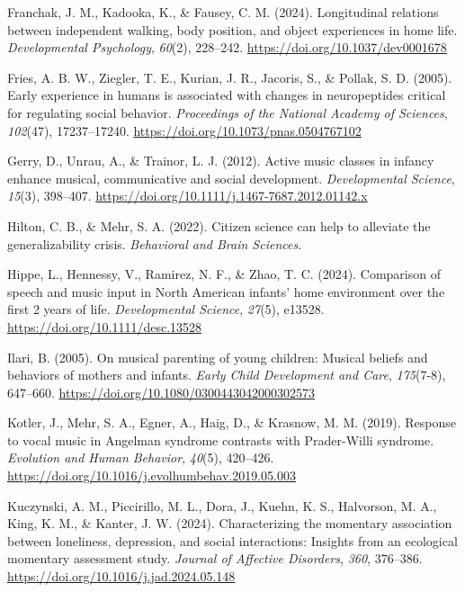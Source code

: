 \documentclass[
]{article}
\newlength{\cslhangindent}
\newenvironment{CSLReferences}[2] %
 {\begin{list}{}{%
  \setlength{\itemindent}{0pt}
  \setlength{\leftmargin}{0pt}
  \setlength{\parsep}{0pt}
  \ifodd #1
   \setlength{\leftmargin}{\cslhangindent}
   \setlength{\itemindent}{-1\cslhangindent}
  \fi
  \setlength{\itemsep}{#2\baselineskip}}}
 {\end{list}}
\begin{document}
\begin{CSLReferences}{1}{0}
Franchak, J. M., Kadooka, K., \& Fausey, C. M. (2024). Longitudinal
relations between independent walking, body position, and object
experiences in home life. \emph{Developmental Psychology}, \emph{60}(2),
228--242. \url{https://doi.org/10.1037/dev0001678}

Fries, A. B. W., Ziegler, T. E., Kurian, J. R., Jacoris, S., \& Pollak,
S. D. (2005). Early experience in humans is associated with changes in
neuropeptides critical for regulating social behavior. \emph{Proceedings
of the National Academy of Sciences}, \emph{102}(47), 17237--17240.
\url{https://doi.org/10.1073/pnas.0504767102}

Gerry, D., Unrau, A., \& Trainor, L. J. (2012). Active music classes in
infancy enhance musical, communicative and social development.
\emph{Developmental Science}, \emph{15}(3), 398--407.
\url{https://doi.org/10.1111/j.1467-7687.2012.01142.x}

Hilton, C. B., \& Mehr, S. A. (2022). Citizen science can help to
alleviate the generalizability crisis. \emph{Behavioral and Brain
Sciences}.

Hippe, L., Hennessy, V., Ramirez, N. F., \& Zhao, T. C. (2024).
Comparison of speech and music input in {North American} infants' home
environment over the first 2 years of life. \emph{Developmental
Science}, \emph{27}(5), e13528. \url{https://doi.org/10.1111/desc.13528}

Ilari, B. (2005). On musical parenting of young children: {Musical}
beliefs and behaviors of mothers and infants. \emph{Early Child
Development and Care}, \emph{175}(7-8), 647--660.
\url{https://doi.org/10.1080/0300443042000302573}

Kotler, J., Mehr, S. A., Egner, A., Haig, D., \& Krasnow, M. M. (2019).
Response to vocal music in {Angelman} syndrome contrasts with
{Prader-Willi} syndrome. \emph{Evolution and Human Behavior},
\emph{40}(5), 420--426.
\url{https://doi.org/10.1016/j.evolhumbehav.2019.05.003}

Kuczynski, A. M., Piccirillo, M. L., Dora, J., Kuehn, K. S., Halvorson,
M. A., King, K. M., \& Kanter, J. W. (2024). Characterizing the
momentary association between loneliness, depression, and social
interactions: {Insights} from an ecological momentary assessment study.
\emph{Journal of Affective Disorders}, \emph{360}, 376--386.
\url{https://doi.org/10.1016/j.jad.2024.05.148}


\end{CSLReferences}
\end{document}
